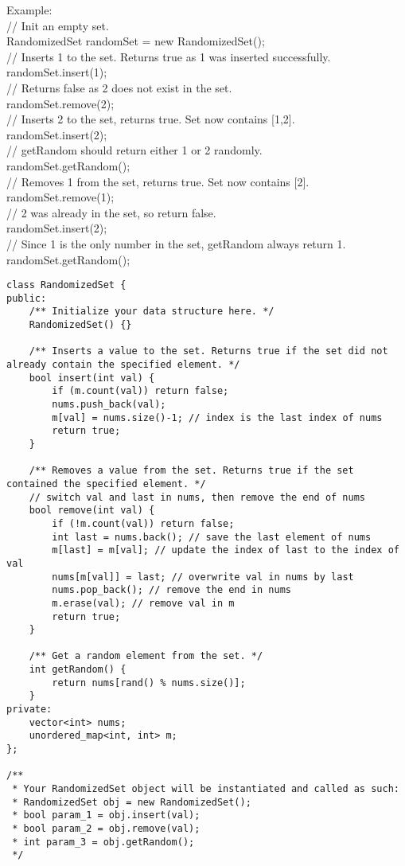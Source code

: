 Example:\\
// Init an empty set.\\
RandomizedSet randomSet = new RandomizedSet();\\

// Inserts 1 to the set. Returns true as 1 was inserted successfully.\\
randomSet.insert(1);\\

// Returns false as 2 does not exist in the set.\\
randomSet.remove(2);\\

// Inserts 2 to the set, returns true. Set now contains [1,2].\\
randomSet.insert(2);\\

// getRandom should return either 1 or 2 randomly.\\
randomSet.getRandom();\\

// Removes 1 from the set, returns true. Set now contains [2].\\
randomSet.remove(1);\\

// 2 was already in the set, so return false.\\
randomSet.insert(2);\\

// Since 1 is the only number in the set, getRandom always return 1.\\
randomSet.getRandom();\\

\begin{lstlisting}
class RandomizedSet {
public:
    /** Initialize your data structure here. */
    RandomizedSet() {}
    
    /** Inserts a value to the set. Returns true if the set did not already contain the specified element. */
    bool insert(int val) {
        if (m.count(val)) return false;
        nums.push_back(val);
        m[val] = nums.size()-1; // index is the last index of nums
        return true;
    }
    
    /** Removes a value from the set. Returns true if the set contained the specified element. */
    // switch val and last in nums, then remove the end of nums
    bool remove(int val) {
        if (!m.count(val)) return false;
        int last = nums.back(); // save the last element of nums
        m[last] = m[val]; // update the index of last to the index of val
        nums[m[val]] = last; // overwrite val in nums by last
        nums.pop_back(); // remove the end in nums
        m.erase(val); // remove val in m
        return true;
    }
    
    /** Get a random element from the set. */
    int getRandom() {
        return nums[rand() % nums.size()];
    }
private:
    vector<int> nums;
    unordered_map<int, int> m;
};

/**
 * Your RandomizedSet object will be instantiated and called as such:
 * RandomizedSet obj = new RandomizedSet();
 * bool param_1 = obj.insert(val);
 * bool param_2 = obj.remove(val);
 * int param_3 = obj.getRandom();
 */
\end{lstlisting}


